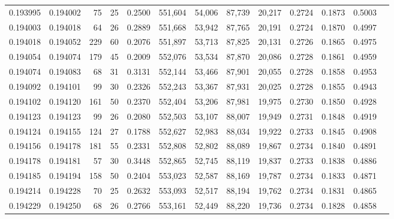 \begin{tabular}{rrrrrrrrrrrrr}
0.193995 & 0.194002 &    75 &  25 &                                     0.2500 & 551,604 &  54,006 &  87,739 &  20,217 & 0.2724 & 0.1873 & 0.5003 \\
0.194003 & 0.194018 &    64 &  26 &                                     0.2889 & 551,668 &  53,942 &  87,765 &  20,191 & 0.2724 & 0.1870 & 0.4997 \\
0.194018 & 0.194052 &   229 &  60 &                                     0.2076 & 551,897 &  53,713 &  87,825 &  20,131 & 0.2726 & 0.1865 & 0.4975 \\
0.194054 & 0.194074 &   179 &  45 &                                     0.2009 & 552,076 &  53,534 &  87,870 &  20,086 & 0.2728 & 0.1861 & 0.4959 \\
0.194074 & 0.194083 &    68 &  31 &                                     0.3131 & 552,144 &  53,466 &  87,901 &  20,055 & 0.2728 & 0.1858 & 0.4953 \\
0.194092 & 0.194101 &    99 &  30 &                                     0.2326 & 552,243 &  53,367 &  87,931 &  20,025 & 0.2728 & 0.1855 & 0.4943 \\
0.194102 & 0.194120 &   161 &  50 &                                     0.2370 & 552,404 &  53,206 &  87,981 &  19,975 & 0.2730 & 0.1850 & 0.4928 \\
0.194123 & 0.194123 &    99 &  26 &                                     0.2080 & 552,503 &  53,107 &  88,007 &  19,949 & 0.2731 & 0.1848 & 0.4919 \\
0.194124 & 0.194155 &   124 &  27 &                                     0.1788 & 552,627 &  52,983 &  88,034 &  19,922 & 0.2733 & 0.1845 & 0.4908 \\
0.194156 & 0.194178 &   181 &  55 &                                     0.2331 & 552,808 &  52,802 &  88,089 &  19,867 & 0.2734 & 0.1840 & 0.4891 \\
0.194178 & 0.194181 &    57 &  30 &                                     0.3448 & 552,865 &  52,745 &  88,119 &  19,837 & 0.2733 & 0.1838 & 0.4886 \\
0.194185 & 0.194194 &   158 &  50 &                                     0.2404 & 553,023 &  52,587 &  88,169 &  19,787 & 0.2734 & 0.1833 & 0.4871 \\
0.194214 & 0.194228 &    70 &  25 &                                     0.2632 & 553,093 &  52,517 &  88,194 &  19,762 & 0.2734 & 0.1831 & 0.4865 \\
0.194229 & 0.194250 &    68 &  26 &                                     0.2766 & 553,161 &  52,449 &  88,220 &  19,736 & 0.2734 & 0.1828 & 0.4858 \\

\end{tabular}
